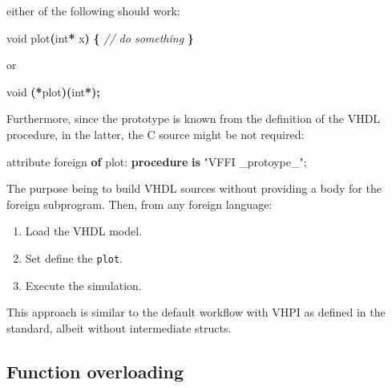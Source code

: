 \documentclass[
]{article}
\newenvironment{Shaded}{\begin{snugshade}}{\end{snugshade}}
\newcommand{\CommentTok}[1]{\textcolor[rgb]{0.56,0.35,0.01}{\textit{#1}}}
\newcommand{\DataTypeTok}[1]{\textcolor[rgb]{0.13,0.29,0.53}{#1}}
\newcommand{\KeywordTok}[1]{\textcolor[rgb]{0.13,0.29,0.53}{\textbf{#1}}}
\newcommand{\NormalTok}[1]{#1}
\newcommand{\OperatorTok}[1]{\textcolor[rgb]{0.81,0.36,0.00}{\textbf{#1}}}
\newcommand{\OtherTok}[1]{\textcolor[rgb]{0.56,0.35,0.01}{#1}}
\newcommand{\StringTok}[1]{\textcolor[rgb]{0.31,0.60,0.02}{#1}}
\providecommand{\tightlist}{%
  \setlength{\itemsep}{0pt}\setlength{\parskip}{0pt}}
\begin{document}
either of the following should work:

\begin{Shaded}
\begin{Highlighting}[]
\DataTypeTok{void}\NormalTok{ plot}\OperatorTok{(}\DataTypeTok{int}\OperatorTok{*}\NormalTok{ x}\OperatorTok{)} \OperatorTok{\{}
  \CommentTok{// do something}
\OperatorTok{\}}
\end{Highlighting}
\end{Shaded}

or

\begin{Shaded}
\begin{Highlighting}[]
\DataTypeTok{void} \OperatorTok{(*}\NormalTok{plot}\OperatorTok{)(}\DataTypeTok{int}\OperatorTok{*);}
\end{Highlighting}
\end{Shaded}

Furthermore, since the prototype is known from the definition of the VHDL procedure, in the latter, the C source might be not required:

\begin{Shaded}
\begin{Highlighting}[]
\OtherTok{attribute}\NormalTok{ foreign }\KeywordTok{of}\NormalTok{ plot}\OtherTok{:} \KeywordTok{procedure} \KeywordTok{is} \StringTok{"VFFI \_protoype\_"}\NormalTok{;}
\end{Highlighting}
\end{Shaded}

The purpose being to build VHDL sources without providing a body for the foreign subprogram. Then, from any foreign language:

\begin{enumerate}
\def\labelenumi{\arabic{enumi}.}
\tightlist
\item
  Load the VHDL model.
\item
  Set define the \texttt{plot}.
\item
  Execute the simulation.
\end{enumerate}

This approach is similar to the default workflow with VHPI as defined in the standard, albeit without intermediate structs.

\hypertarget{function-overloading}{%
\subsection{Function overloading}\label{function-overloading}}
\end{document}
